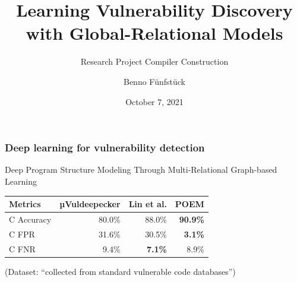 \documentclass[169]{beamer}
\title{Learning Vulnerability Discovery with Global-Relational Models}
\subtitle{Research Project Compiler Construction}
\author{Benno Fünfstück}
\date{October 7, 2021}
\begin{document}



\newcommand\makenode[2]{%
  \tikz[baseline=0pt, remember picture] { \node[fill=gray!50,thick,rounded corners,anchor=base,#1/.try] (listings-\the\value{tmlistings}) {{\scriptsize\the\value{tmlistings}} #2}; }%
  \stepcounter{tmlistings}%
}

\maketitle

\begin{frame}\frametitle{Deep learning for vulnerability detection}
  {\mbox {\hbox{\hskip2pt\hskip1pt}} Deep Program Structure Modeling Through Multi-Relational Graph-based Learning~\cite{ye_deep_2020}}

  \vspace{10pt}

  \begin{tabular}{lrrr}
    \toprule
    Metrics & µVuldeepecker & Lin et al. & {\bfseries POEM} \\
    \midrule
    C Accuracy & 80.0\% & 88.0\% & \bfseries{90.9\%} \\
    C FPR      & 31.6\% & 30.5\% & \bfseries{3.1\%} \\
    C FNR      & 9.4\%  & \bfseries{7.1\%}  & 8.9\% \\
    \bottomrule
  \end{tabular}

  (Dataset: ``collected from standard vulnerable code databases'')
\end{frame}
\end{document}
